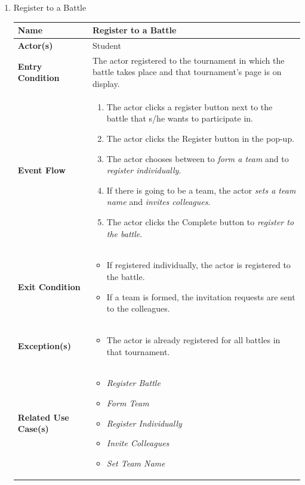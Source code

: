 \begin{enumerate}
\item Register to a Battle
\begin{center}
    \begin{tabular}{ | m{10em} | m{10cm}| } 
      \hline
      \textbf{Name} & Register to a Battle  \\ 
      \hline
      \textbf{Actor(s)} & Student \\ 
      \hline
      \textbf{Entry Condition} & The actor registered to the tournament in which the battle takes place and that tournament's page is on display. \\ 
      \hline
      \textbf{Event Flow} & 
          \begin{enumerate}[(1)]
              \item The actor clicks a register button next to the battle that s/he wants to participate in.
              \item The actor clicks the Register button in the pop-up.
              \item The actor chooses between to \textit{form a team} and to \textit{register individually}. 
              \item If there is going to be a team, the actor \textit{sets a team name} and \textit{invites colleagues}.
              \item The actor clicks the Complete button to \textit{register to the battle}.
          \end{enumerate}
      \\ 
      \hline
      \textbf{Exit Condition} & 
      \begin{itemize}
          \item If registered individually, the actor is registered to the battle.
          \item If a team is formed, the invitation requests are sent to the colleagues.
      \end{itemize}
        \\ 
      \hline
      \textbf{Exception(s)} & 
      \begin{itemize}
          \item The actor is already registered for all battles in that tournament.
      \end{itemize}
          \\ 
      \hline
      \textbf{Related Use Case(s)} & 
      \begin{itemize}
          \item \textit{Register Battle}
          \item \textit{Form Team}
          \item \textit{Register Individually}
          \item \textit{Invite Colleagues}
          \item \textit{Set Team Name}
      \end{itemize}
          \\ 
      \hline
    \end{tabular}
\end{center}



\end{enumerate}
